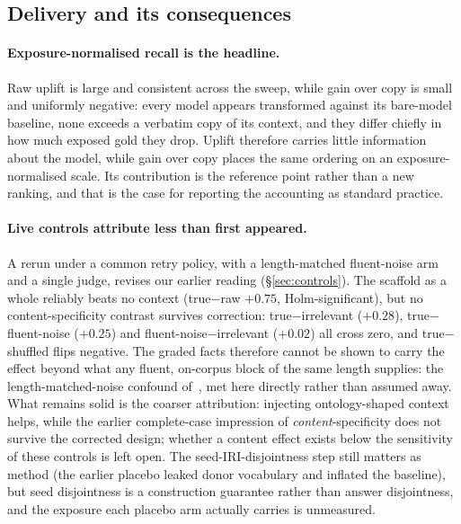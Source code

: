 \documentclass[10pt,twocolumn]{article}
\begin{document}
\subsection{Delivery and its consequences}
\paragraph{Exposure-normalised recall is the headline.} Raw uplift is large and consistent across the sweep, while gain over copy is small and uniformly negative: every model appears transformed against its bare-model baseline, none exceeds a verbatim copy of its context, and they differ chiefly in how much exposed gold they drop. Uplift therefore carries little information about the model, while gain over copy places the same ordering on an exposure-normalised scale. Its contribution is the reference point rather than a new ranking, and that is the case for reporting the accounting as standard practice.

\paragraph{Live controls attribute less than first appeared.} A rerun under a common retry policy, with a length-matched fluent-noise arm and a single judge, revises our earlier reading (\S\ref{sec:controls}). The scaffold as a whole reliably beats no context (true$-$raw $+0.75$, Holm-significant), but no content-specificity contrast survives correction: true$-$irrelevant ($+0.28$), true$-$fluent-noise ($+0.25$) and fluent-noise$-$irrelevant ($+0.02$) all cross zero, and true$-$shuffled flips negative. The graded facts therefore cannot be shown to carry the effect beyond what any fluent, on-corpus block of the same length supplies: the length-matched-noise confound of~\textcite{cuconasu2024poweofnoise}, met here directly rather than assumed away. What remains solid is the coarser attribution: injecting ontology-shaped context helps, while the earlier complete-case impression of \emph{content}-specificity does not survive the corrected design; whether a content effect exists below the sensitivity of these controls is left open. The seed-IRI-disjointness step still matters as method (the earlier placebo leaked donor vocabulary and inflated the baseline), but seed disjointness is a construction guarantee rather than answer disjointness, and the exposure each placebo arm actually carries is unmeasured.
\end{document}
